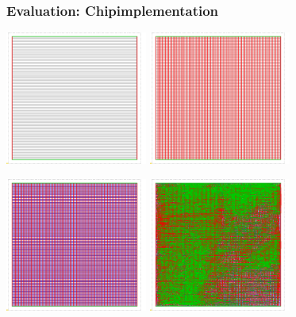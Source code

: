 \begin{frame}\frametitle{Evaluation: Chipimplementation}
\begin{center}
        \includegraphics[width=0.35\textwidth]{img/FP_2.png}
        \quad
        \includegraphics[width=0.35\textwidth]{img/FP_3.png}
        
        \includegraphics[width=0.35\textwidth]{img/FP_4.png}
        \quad
        \includegraphics[width=0.35\textwidth]{img/FP_5.png}
\end{center}
\end{frame}


